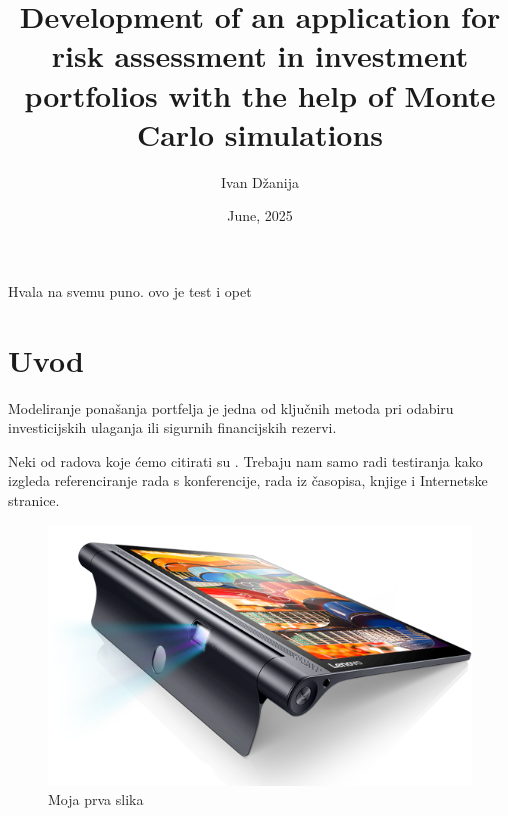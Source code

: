 \documentclass[zavrsnirad]{fer}
\title{Development of an application for risk assessment in investment portfolios with the help of Monte Carlo simulations}
\author{Ivan Džanija}
\date{June, 2025}
\begin{document}
\maketitle




\begin{zahvale}
	Hvala na svemu puno.
	ovo je test i opet
\end{zahvale}

\mainmatter

\tableofcontents

\chapter{Uvod}
\label{pog:uvod}

Modeliranje ponašanja portfelja je jedna od ključnih metoda pri odabiru
investicijskih ulaganja ili sigurnih financijskih rezervi.

Neki od radova koje ćemo citirati su \cite{1,2,6248073,6247753,ghiglia_pritt_phase_unwrapping,4250461}.
Trebaju nam samo radi testiranja kako izgleda referenciranje rada s konferencije, rada iz časopisa, knjige i Internetske stranice.

\begin{figure}[htb]
	\centering
	\includegraphics[width=0.38\linewidth]{Figures/lenovo_yoga_tab3_pro_front.png}
	\caption{Moja prva slika}
	\label{slk:prvaslika}
\end{figure}
\end{document}

